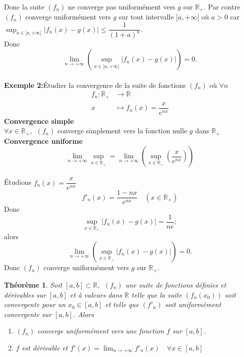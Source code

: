 \documentclass[11pt, a4paper]{book}
\newtheorem{teo}{Th\'eor\`eme}[section]
\begin{document}
Donc la suite $(f_n)$ ne converge pas uniform\'ement vers $g$ sur $\mathbb{R_+}.$ Par contre $(f_n)$ converge uniform\'ement vers $g$ sur tout intervalle $[a,+\infty[$ o\`u $a>0$ car ${\displaystyle \sup_{x\in[a,+\infty[}|f_n(x)-g(x)|\leq\dfrac{1}{(1+a)^n}.}$\\ Donc $$\lim_{n\rightarrow+\infty}\left(\sup_{x\in[a,+\infty[}|f_n(x)-g(x)|\right)=0.$$\\
\textbf{Exemple 2:}\quad \'Etudier la convergence de la suite de fonctions $(f_n)$ o\`u $\forall n$ 
\begin{align*}
f_n: \mathbb{R_+}&\longrightarrow\mathbb{R}\\ x&\longmapsto f_n(x)=\dfrac{x}{e^{nx}}
\end{align*}
\textbf{Convergence simple}\\
$\forall x\in \mathbb{R_+},~~(f_n)$ converge simplement vers la fonction nulle $g$ dans $\mathbb{R_+}$\\
\textbf{Convergence uniforme}\\
$$\lim_{n\rightarrow+\infty}\sup_{x\in\mathbb{R_+}}=\lim_{n\rightarrow+\infty}\left(\sup_{x\in \mathbb{R_+}}\left(\dfrac{x}{e^{nx}}\right)\right)$$\\
\'Etudions $f_n(x)=\dfrac{x}{e^{nx}}$ $$f'_n(x)=\dfrac{1-nx}{e^{nx}}\quad(x\in \mathbb{R_+})$$
Donc $$\sup_{x\in\mathbb{R_+}}|f_n(x)-g(x)|=\dfrac{1}{ne};$$ alors $$\lim_{n\rightarrow +\infty}\left(\sup_{x\in\mathbb{R_+}}|f_n(x)-g(x)|\right)=0.$$ Donc $(f_n)$ converge uniform\'ement vers $g$ sur $\mathbb{R_+}$.
\begin{teo} \label{teo4.4.3} Soit $[a,b]\subset\mathbb{R},~~(f_n)$ une suite de fonctions d\'efinies et d\'erivables sur $[a,b]$ et \`a valeurs dans $\mathbb{R}$ telle que la suite $(f_n(x_0))$ soit convergente pour un $x_0\in [a,b]$ et telle que $(f'_n)$ soit uniform\'ement convergente sur $[a,b]$. Alors 
\begin{enumerate}
\item $(f_n)$ converge uniform\'ement vers une fonction $f$ sur $[a,b]$.
\item $f$ est d\'erivable et ${\displaystyle f'(x)=\lim_{n\rightarrow+\infty}f'_n(x)\quad\forall x\in [a,b]}$
\end{enumerate}
\end{teo}
\end{document}
